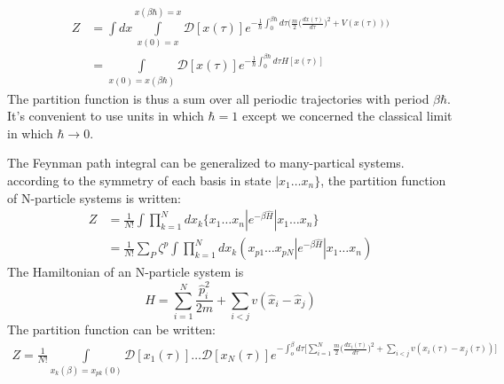 \documentclass[12pt]{article}
\begin{document}
\begin{equation*}
    \begin{split}
        Z&=\int dx\int\limits_{x(0)=x}^{x(\beta\hbar)=x}\mathcal{D}[x(\tau)]e^{-\frac{1}{\hbar}
        \int_{0}^{\beta\hbar}d\tau\Big(\frac{m}{2}\big(\frac{dx(\tau)}{d\tau}\big)^2
        +V(x(\tau))\Big)}\\
        &=\int\limits_{x(0)=x(\beta\hbar)}\mathcal{D}[x(\tau)]e^{-\frac{1}{\hbar}
        \int_{0}^{\beta\hbar}d\tau H[x(\tau)]}
    \end{split}
\end{equation*}
The partition function is thus a sum over all periodic trajectories with period 
$\beta\hbar$. It's convenient to use units in which $\hbar=1$ except we concerned 
the classical limit in which $\hbar\rightarrow0$.

The Feynman path integral can be generalized to many-partical systems. according 
to the symmetry of each basis in state $|x_1\dots x_n\}$, the partition function 
of N-particle systems is written:
\begin{equation*}
    \begin{split}
        Z&=\frac{1}{N!}\int\prod_{k=1}^Ndx_k\{x_1\dots x_n|e^{-\beta\hat{H}}|x_1\dots x_n\}\\
        &=\frac{1}{N!}\sum_P\zeta^p\int\prod_{k=1}^Ndx_k(x_{p1}\dots x_{pN}|
        e^{-\beta\hat{H}}|x_1\dots x_n)
    \end{split}
\end{equation*}
The Hamiltonian of an N-particle system is 
\begin{equation*}
    H=\sum_{i=1}^N\frac{\hat{p}^2_i}{2m}+\sum_{i<j}v(\hat{x}_i-\hat{x}_j)
\end{equation*}
The partition function can be written:
\begin{equation*}
    \begin{split}
        Z=\frac{1}{N!}\int\limits_{x_k(\beta)=x_{pk}(0)}\mathcal{D}[x_1(\tau)]\dots
        \mathcal{D}[x_N(\tau)]e^{-\int_o^\beta d\tau\big[\sum_{i=1}^N\frac{m}{2}
        \big(\frac{dx_i(\tau)}{d\tau}\big)^2+\sum_{i<j}v(x_i(\tau)-x_j(\tau))\big]}
    \end{split}
\end{equation*}
\end{document}
